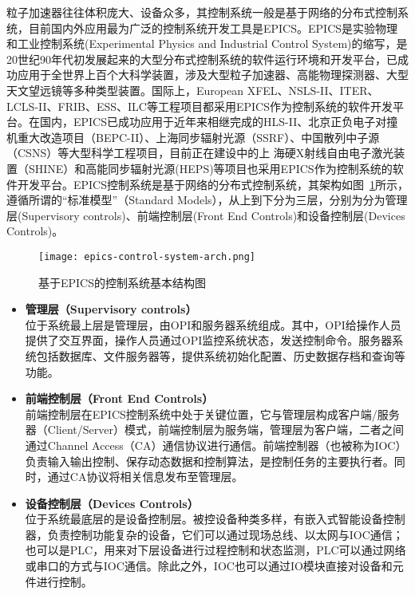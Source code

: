 粒子加速器往往体积庞大、设备众多，其控制系统一般是基于网络的分布式控制系统，目前国内外应用最为广泛的控制系统开发工具是EPICS。EPICS是实验物理和工业控制系统(Experimental Physics and Industrial Control System)的缩写，是20世纪90年代初发展起来的大型分布式控制系统的软件运行环境和开发平台，已成功应用于全世界上百个大科学装置，涉及大型粒子加速器、高能物理探测器、大型天文望远镜等多种类型装置\cite{EPICS}。国际上，European XFEL、NSLS-II、ITER、LCLS-II、FRIB、ESS、ILC等工程项目都采用EPICS作为控制系统的软件开发平台\cite{Aghababyan2015,Carcassi2009,Wallander,Flath2017,Shen2016,Arredondo2013,carwardine-2007}。在国内，EPICS已成功应用于近年来相继完成的HLS-II、北京正负电子对撞机重大改造项目（BEPC-II）、上海同步辐射光源（SSRF）、中国散列中子源（CSNS）等大型科学工程项目\cite{liweimin-control-2007, Zhao2007,Shen2010,C.H.Wang2011}，目前正在建设中的上
海硬X射线自由电子激光装置（SHINE）和高能同步辐射光源(HEPS)等项目也采用EPICS作为控制系统的软件开发平台\cite{Lv2018a,Chu2018a}。EPICS控制系统是基于网络的分布式控制系统，其架构如图~\ref{fig:epics-control-system-arch}所示，遵循所谓的“标准模型”（Standard Models）\cite{Kuiper1991}，从上到下分为三层，分别为分为管理层(Supervisory controls)、前端控制层(Front End Controls)和设备控制层(Devices Controls)。

\begin{figure}[!htb]
	\centering
	\texttt{[image: epics-control-system-arch.png]}
	\caption{基于EPICS的控制系统基本结构图}
	\label{fig:epics-control-system-arch}
\end{figure}

\begin{itemize}
	\item \textbf{管理层（Supervisory controls）} \\ 
	位于系统最上层是管理层，由OPI和服务器系统组成。其中，OPI给操作人员提供了交互界面，操作人员通过OPI监控系统状态，发送控制命令。服务器系统包括数据库、文件服务器等，提供系统初始化配置、历史数据存档和查询等功能。
	\item \textbf{前端控制层（Front End Controls）} \\ 
	前端控制层在EPICS控制系统中处于关键位置，它与管理层构成客户端/服务器（Client/Server）模式，前端控制层为服务端，管理层为客户端，二者之间通过Channel Access（CA）通信协议进行通信。前端控制器（也被称为IOC）负责输入输出控制、保存动态数据和控制算法，是控制任务的主要执行者。同时，通过CA协议将相关信息发布至管理层。
	\item \textbf{设备控制层（Devices Controls）} \\ 
	位于系统最底层的是设备控制层。被控设备种类多样，有嵌入式智能设备控制器，负责控制功能复杂的设备，它们可以通过现场总线、以太网与IOC通信；也可以是PLC，用来对下层设备进行过程控制和状态监测，PLC可以通过网络或串口的方式与IOC通信。除此之外，IOC也可以通过IO模块直接对设备和元件进行控制。
\end{itemize}

